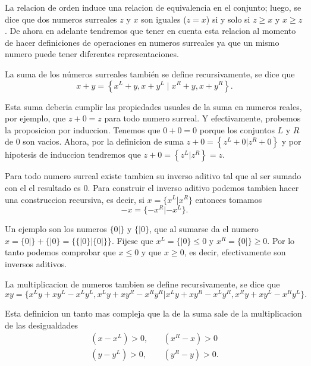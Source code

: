 \documentclass{article}
\begin{document}
    La relacion de orden induce una relacion de equivalencia en el conjunto; luego, se dice que dos numeros surreales $z$ y $x$ son iguales ($z=x$) si y solo si $z\ge x$ y $x\ge z$. De ahora en adelante tendremos que tener en cuenta esta relacion al momento de hacer definiciones de operaciones en numeros surreales ya que un mismo numero puede tener diferentes representaciones.

    La suma de los números surreales también se define recursivamente, se dice que
    \[
        x + y  = \left\{x^L+y, x+y^L\;|\;x^R+y, x+y^R\right\}.
    \]

    Esta suma deberia cumplir las propiedades usuales de la suma en numeros reales, por ejemplo, que $z+0=z$ para todo numero surreal. Y efectivamente, probemos la proposicion por induccion. Tenemos que $0+0 = 0$ porque los conjuntos $L$ y $R$ de $0$ son vacios. Ahora, por la definicion de suma $z+0 = \left\{z^L+0|z^R+0\right\}$ y por hipotesis de induccion tendremos que $z+0 = \left\{z^L|z^R\right\} = z$.

    Para todo numero surreal existe tambien su inverso aditivo tal que al ser sumado con el el resultado es $0$. Para construir el inverso aditivo podemos tambien hacer una construccion recursiva, es decir, si $x=\{x^L|x^R\}$ entonces tomamos 
    \[
        -x = \{-x^R|-x^L\}.
    \]

    Un ejemplo son los numeros $\{0|\}$ y $\{|0\}$, que al sumarse da el numero $x = \{0|\} + \{|0\} = \{\{|0\}|\{0|\}\}$. Fijese que $x^L = \{|0\}\le 0$ y $x^R = \{0|\}\ge 0$. Por lo tanto podemos comprobar que $x\le 0$ y que $x \ge 0$, es decir, efectivamente son inversos aditivos.

    La multiplicacion de numeros tambien se define recursivamente, se dice que
    \[
        xy = \{x^Ly+xy^L-x^Ly^L, x^Ly+xy^R-x^Ry^R| x^Ly+xy^R-x^Ly^R, x^Ry+xy^L-x^Ry^L\}.
    \]

    Esta definicion un tanto mas compleja que la de la suma sale de la multiplicacion de las desigualdades
    \begin{align*}
        (x-x^L) > 0, \quad & (x^R-x)>0 \\
        (y-y^L) > 0, \quad & (y^R-y)>0.
    \end{align*}
    
\end{document}
